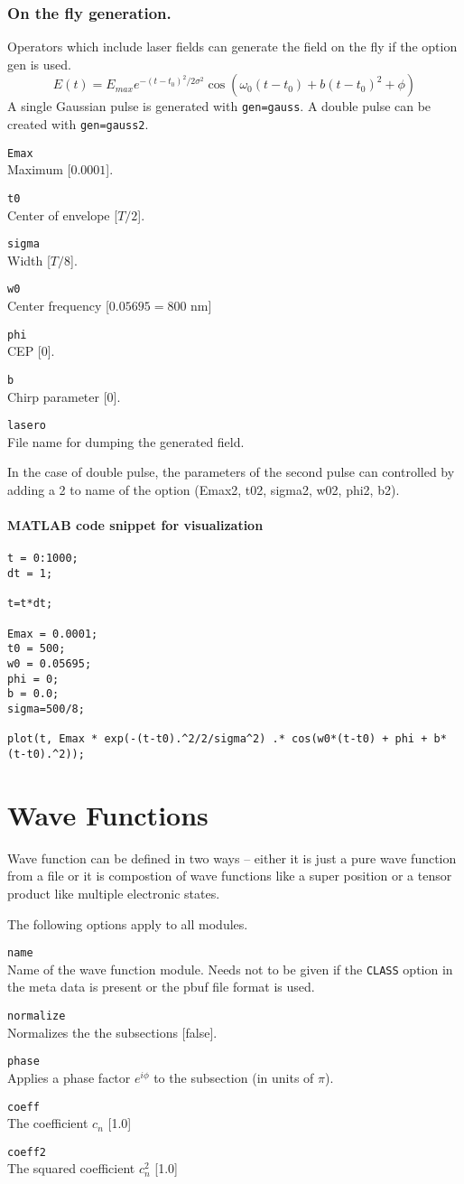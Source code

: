 \documentclass[a4paper,12pt]{scrbook}
\newcommand{\option}[2]{\item \texttt{#1}\\ #2}
\newcommand{\code}[1]{\texttt{#1}}
\begin{document}
\subsection{On the fly generation.}
Operators which include laser fields can generate the field on the fly if the option gen is used.
\begin{equation}
E(t) = E_{max} e^{-(t-t_0)^2/2\sigma^2} \cos(\omega_0 (t-t_0)+ b(t-t_0)^2+\phi)
\end{equation}
A single Gaussian pulse is generated with \verb|gen=gauss|. A double pulse can be created with
\verb|gen=gauss2|.
\begin{options}
 \option{Emax}{Maximum [$0.0001$].}
 \option{t0}{Center of envelope [$T/2$].}
 \option{sigma}{Width [$T/8$].}
 \option{w0}{Center frequency [$0.05695 = 800$ nm]}
 \option{phi}{CEP [0].}
 \option{b}{Chirp parameter [0].}
 \option{lasero}{File name for dumping the generated field.}
\end{options}
In the case of double pulse, the parameters of the second pulse can controlled by adding a 2 to
name of the option (Emax2, t02, sigma2, w02, phi2, b2).

\subsubsection*{MATLAB code snippet for visualization}
\begin{verbatim}
t = 0:1000;
dt = 1;

t=t*dt;

Emax = 0.0001;
t0 = 500;
w0 = 0.05695;
phi = 0;
b = 0.0;
sigma=500/8;

plot(t, Emax * exp(-(t-t0).^2/2/sigma^2) .* cos(w0*(t-t0) + phi + b*(t-t0).^2));
\end{verbatim}


\chapter{Wave Functions}
Wave function can be defined in two ways -- either it is just a pure wave function from a
file or it is compostion of wave functions like a super position or a tensor product like
multiple electronic states.

The following options apply to all modules.
\begin{options}
 \option{name}{Name of the wave function module. Needs not to be given if the \code{CLASS} option in the meta data is present or the pbuf file format is used.}
 \option{normalize}{Normalizes the the subsections [false].}
 \option{phase}{Applies a phase factor $e^{i\phi}$ to the subsection (in units of $\pi$).}
 \option{coeff}{The coefficient $c_n$ [1.0]}
 \option{coeff2}{The squared coefficient $c^2_n$ [1.0]}
\end{options}
\end{document}

